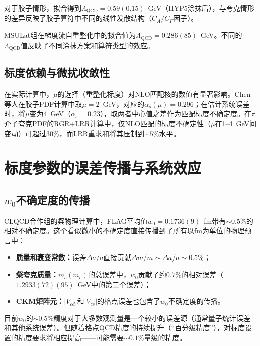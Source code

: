 \documentclass[12pt,a4paper]{ctexart}
\theoremstyle{definition}
\begin{document}
对于胶子情形\cite{Chen2025gluon}，拟合得到$\Lambda_{\text{QCD}} = 0.59(0.15)$~GeV（HYP5涂抹后），与夸克情形的差异反映了胶子算符中不同的线性发散结构（$C_A/C_F$因子）。

MSULat组在梯度流自重整化中的拟合值\cite{NieMiera2025}为$\Lambda_{\text{QCD}} = 0.286(85)$~GeV。不同的$\Lambda_{\text{QCD}}$值反映了不同涂抹方案和算符类型的效应。

\subsection{标度依赖与微扰收敛性}

在实际计算中，$\mu$的选择（重整化标度）对NLO匹配核的数值有显著影响。Chen等人\cite{Chen2025gluon}在胶子PDF计算中取$\mu = 2$~GeV，对应的$\alpha_s(\mu) = 0.296$；在估计系统误差时，将$\mu$变为4~GeV（$\alpha_s = 0.23$），取两者中心值之差作为匹配标度不确定度。在$\pi$介子夸克PDF的RGR+LRR计算中\cite{Zhang2023RGR}，仅NLO匹配的标度不确定性（$\mu$在1--4~GeV间变动）可超过30\%，而LRR重求和将其压制到$\sim 5\%$水平。

\section{标度参数的误差传播与系统效应}

\subsection{$w_0$不确定度的传播}

CLQCD合作组的粲物理计算中\cite{CLQCD2024charm}，FLAG平均值$w_0 = 0.1736(9)$~fm带有$\sim 0.5\%$的相对不确定度。这个看似微小的不确定度直接传播到了所有以fm为单位的物理预言中：

\begin{itemize}
    \item \textbf{质量和衰变常数：}误差$\Delta a/a$直接贡献$\Delta m/m \sim \Delta a/a \sim 0.5\%$；
    \item \textbf{粲夸克质量：}$m_c(m_c)$的总误差中，$w_0$贡献了约$0.7\%$的相对误差（$1.2933(72)(95)$~GeV中的第二个误差）；
    \item \textbf{CKM矩阵元：}$|V_{cd}|$和$|V_{cs}|$的格点误差也包含了$w_0$不确定度的传播。
\end{itemize}

目前$w_0$的$\sim 0.5\%$精度对于大多数观测量是一个较小的误差源（通常量子统计误差和其他系统误差）。但随着格点QCD精度的持续提升（``百分级精度''），对标度设置的精度要求将相应提高——可能需要$\sim 0.1\%$量级的精度。
\end{document}
